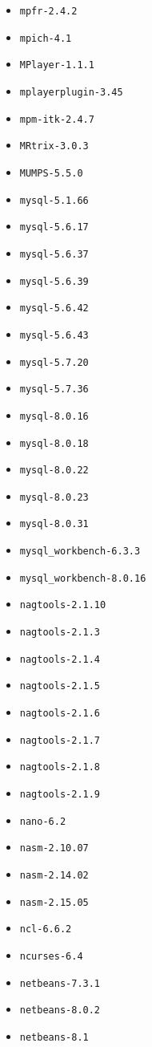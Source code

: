 \begin{multicols}{3}
\begin{itemize}
\item \verb|mpfr-2.4.2|
\item \verb|mpich-4.1|
\item \verb|MPlayer-1.1.1|
\item \verb|mplayerplugin-3.45|
\item \verb|mpm-itk-2.4.7|
\item \verb|MRtrix-3.0.3|
\item \verb|MUMPS-5.5.0|
\item \verb|mysql-5.1.66|
\item \verb|mysql-5.6.17|
\item \verb|mysql-5.6.37|
\item \verb|mysql-5.6.39|
\item \verb|mysql-5.6.42|
\item \verb|mysql-5.6.43|
\item \verb|mysql-5.7.20|
\item \verb|mysql-5.7.36|
\item \verb|mysql-8.0.16|
\item \verb|mysql-8.0.18|
\item \verb|mysql-8.0.22|
\item \verb|mysql-8.0.23|
\item \verb|mysql-8.0.31|
\item \verb|mysql_workbench-6.3.3|
\item \verb|mysql_workbench-8.0.16|
\item \verb|nagtools-2.1.10|
\item \verb|nagtools-2.1.3|
\item \verb|nagtools-2.1.4|
\item \verb|nagtools-2.1.5|
\item \verb|nagtools-2.1.6|
\item \verb|nagtools-2.1.7|
\item \verb|nagtools-2.1.8|
\item \verb|nagtools-2.1.9|
\item \verb|nano-6.2|
\item \verb|nasm-2.10.07|
\item \verb|nasm-2.14.02|
\item \verb|nasm-2.15.05|
\item \verb|ncl-6.6.2|
\item \verb|ncurses-6.4|
\item \verb|netbeans-7.3.1|
\item \verb|netbeans-8.0.2|
\item \verb|netbeans-8.1|

\end{itemize}
\end{multicols}
